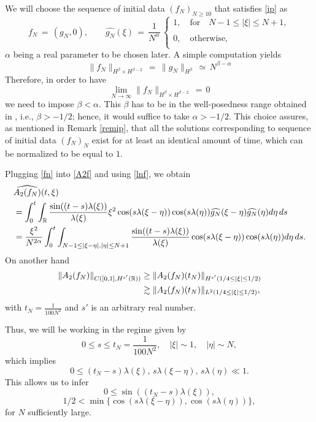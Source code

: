 \documentclass{amsart}
\begin{document}
We will choose the sequence of initial data $(f_N)_{N\geq 10}$ that satisfies \eqref{ip} as
\begin{equation}
f_N\,=\,(g_N, 0), \qquad \widehat{g_N}(\xi)\,=\,\frac{1}{N^\alpha}\,\left\{
\begin{array}{l}
1,\quad \text{for} \quad N-1\leq |\xi| \leq N+1,\\
\\
0,\quad \text{otherwise},\\
\end{array}\right.
\label{fn}
\end{equation}
$\alpha$ being a real parameter to be chosen later. A simple computation yields
\begin{equation}
\|f_N\|_{H^\beta\times H^{\beta-2}}\,=\,\|g_N\|_{H^\beta}\,\simeq\,N^{\beta-\alpha}
\label{hsfn}
\end{equation}
Therefore, in order to have 
\[
\lim_{N\to \infty} \|f_N\|_{H^\beta \times H^{\beta -2}}\,=\,0
\]
we need to impose $\beta<\alpha$. This $\beta$ has to be in the well-posedness range obtained in \cite{KT10}, i.e., $\beta>-1/2$; hence, it would suffice to take $\alpha >-1/2$. This choice assures, as mentioned in Remark \ref{remip}, that all the solutions corresponding to sequence of initial data $(f_N)_N$ exist for at least an identical amount of time, which can be normalized to be equal to $1$. 

Plugging \eqref{fn} into \eqref{A2f} and using \eqref{lnf}, we obtain
\begin{equation}
\aligned
&\widehat{A_2(f_N)}(t,\xi)\\
&=\int_0^t \int_{\mathbb{R}} \frac{\sin((t-s) \lambda(\xi))}{\lambda(\xi)} \xi^2 \cos(s \lambda(\xi-\eta))\cos(s\lambda(\eta))\widehat{g_N}(\xi-\eta)\widehat{g_N}(\eta)d\eta\,ds\\
&=\frac{\xi^2}{N^{2\alpha}}\int_0^t \int_{N-1\leq |\xi-\eta|, |\eta| \leq N+1}\frac{\sin((t-s) \lambda(\xi))}{\lambda(\xi)}\cos(s \lambda(\xi-\eta))\cos(s\lambda(\eta))d\eta\,ds.\endaligned
\label{A2fn}
\end{equation}
On another hand
\begin{equation}
\aligned
\|A_2(f_N)\|_{C([0,1], H^{s'}(\mathbb{R}))} &\geq \|A_2(f_N)(t_N)\|_{H^{s'}(1/4\leq |\xi| \leq 1/2)}\\ &\gtrsim \|A_2(f_N)(t_N)\|_{L^2(1/4\leq |\xi| \leq 1/2)},\label{hsA2}
\endaligned
\end{equation}
with $t_N=\frac{1}{100 N^2}$ and $s'$ is an arbitrary real number.

Thus, we will be working in the regime given by
\[
0\leq s\leq t_N=\frac{1}{100 N^2}, \quad |\xi|\sim 1, \quad |\eta|\sim N,\]
which implies
\[
0 \leq (t_N-s) \lambda(\xi),\,s \lambda(\xi-\eta),\, s\lambda(\eta) \ll 1. \]
This allows us to infer
\[
0 \leq \sin ((t_N-s) \lambda(\xi)),
\]
\[
1/2 < \min\{\cos(s \lambda(\xi-\eta)), \cos(s\lambda(\eta))\},
\]
for $N$ sufficiently large. 
\end{document}
